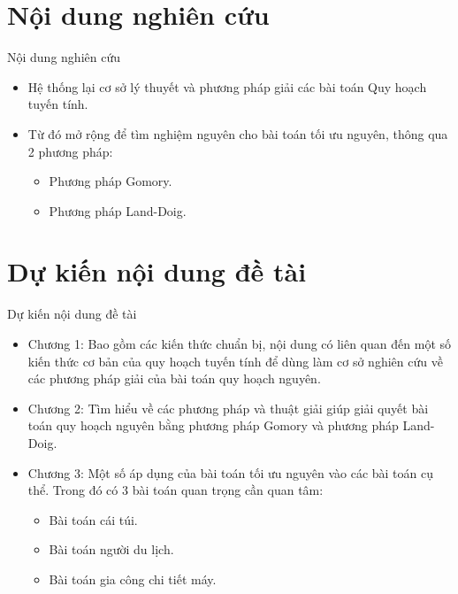 \documentclass{beamer}
\begin{document}
\section{Nội dung nghiên cứu}
\begin{frame}{Nội dung nghiên cứu}
    \begin{itemize}
    \item Hệ thống lại cơ sở lý thuyết và phương pháp giải các bài toán Quy hoạch tuyến tính.
    \item Từ đó mở rộng để tìm nghiệm nguyên cho bài toán tối ưu nguyên, thông qua 2 phương pháp:
    \begin{itemize}
    \item Phương pháp Gomory.
    \item Phương pháp Land-Doig.
    \end{itemize}
    \end{itemize}
\end{frame}
\section{Dự kiến nội dung đề tài}
\begin{frame}{Dự kiến nội dung đề tài}
    \begin{itemize}
    \item Chương 1:  Bao gồm các kiến thức chuẩn bị, nội dung có liên quan đến
    một số kiến thức cơ bản của quy hoạch tuyến tính để dùng
    làm cơ sở nghiên cứu về các phương pháp giải của bài toán quy hoạch nguyên.
    \item Chương 2: Tìm hiểu về các phương pháp và thuật giải giúp giải quyết bài toán quy hoạch nguyên bằng phương pháp Gomory và phương pháp Land-Doig.
    \item Chương 3: Một số áp dụng của bài toán tối ưu nguyên vào các bài toán cụ thể. Trong đó có 3 bài toán quan trọng cần quan tâm:
    \begin{itemize}
        \item Bài toán cái túi.
        \item Bài toán người du lịch.
        \item Bài toán gia công chi tiết máy. 
    \end{itemize}
    \end{itemize}   
\end{frame}
\end{document}
